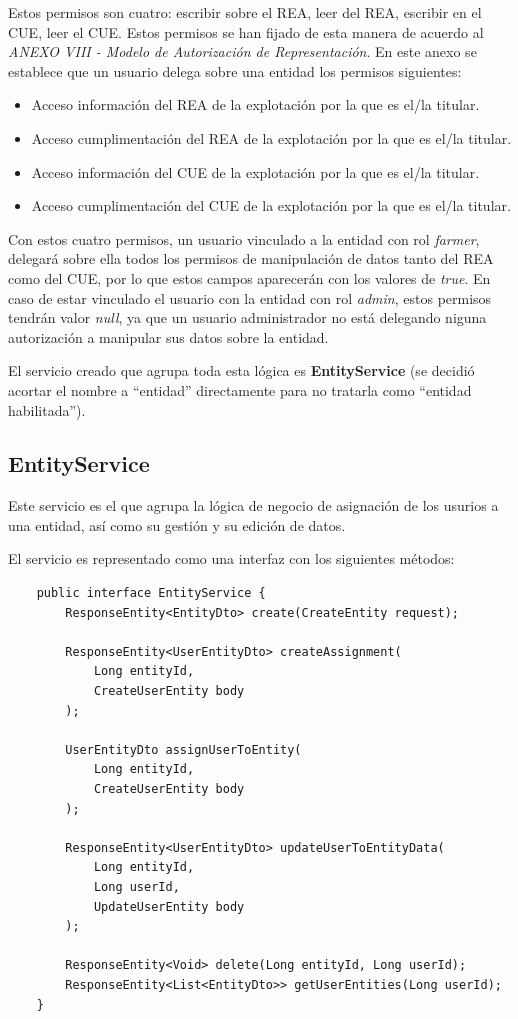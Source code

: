 Estos permisos son cuatro: escribir sobre el REA, leer del REA, escribir en el CUE, leer el CUE. Estos permisos se han fijado de esta manera de acuerdo al \textit{ANEXO VIII - 
Modelo de Autorización de Representación}. En este anexo se establece que un usuario delega sobre una entidad los permisos siguientes:

\begin{itemize}
    \item Acceso información del REA de la explotación por la que es el/la titular.
    \item Acceso cumplimentación del REA de la explotación por la que es el/la titular.
    \item Acceso información del CUE de la explotación por la que es el/la titular.
    \item Acceso cumplimentación del CUE de la explotación por la que es el/la titular. 
\end{itemize}

Con estos cuatro permisos, un usuario vinculado a la entidad con rol \textit{farmer}, delegará sobre ella todos los permisos de manipulación de datos tanto del REA como del CUE,
por lo que estos campos aparecerán con los valores de \textit{true}. En caso de estar vinculado el usuario con la entidad con rol \textit{admin}, estos permisos tendrán valor 
\textit{null}, ya que un usuario administrador no está delegando niguna autorización a manipular sus datos sobre la entidad.

El servicio creado que agrupa toda esta lógica es \textbf{EntityService} (se decidió acortar el nombre a ``entidad'' directamente para no tratarla como ``entidad habilitada'').

\subsection{EntityService}

Este servicio es el que agrupa la lógica de negocio de asignación de los usurios a una entidad, así como su gestión y su edición de datos.

El servicio es representado como una interfaz con los siguientes métodos:

\begin{verbatim}
    public interface EntityService {
        ResponseEntity<EntityDto> create(CreateEntity request);

        ResponseEntity<UserEntityDto> createAssignment(
            Long entityId,
            CreateUserEntity body
        );

        UserEntityDto assignUserToEntity(
            Long entityId,
            CreateUserEntity body
        );

        ResponseEntity<UserEntityDto> updateUserToEntityData(
            Long entityId,
            Long userId,
            UpdateUserEntity body
        );

        ResponseEntity<Void> delete(Long entityId, Long userId);
        ResponseEntity<List<EntityDto>> getUserEntities(Long userId);
    }
\end{verbatim}

